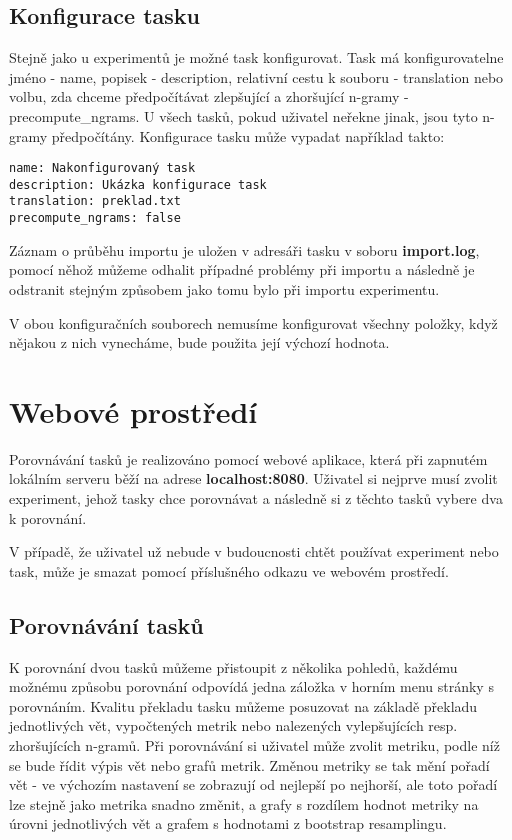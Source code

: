 \subsection{Konfigurace tasku}
Stejně jako u experimentů je možné task konfigurovat.
Task má konfigurovatelne jméno - name, popisek - description,
  relativní cestu k souboru - translation nebo volbu,
  zda chceme předpočítávat zlepšující a zhoršující n-gramy - precompute\_ngrams.
U všech tasků, pokud uživatel neřekne jinak, 
  jsou tyto n-gramy předpočítány.
Konfigurace tasku může vypadat například takto:

\begin{verbatim}
name: Nakonfigurovaný task
description: Ukázka konfigurace task
translation: preklad.txt
precompute_ngrams: false
\end{verbatim}

Záznam o průběhu importu je uložen v adresáři tasku v soboru \textbf{import.log},
  pomocí něhož můžeme odhalit případné problémy při importu
  a následně je odstranit stejným způsobem jako tomu bylo při importu experimentu.

V obou konfiguračních souborech nemusíme konfigurovat všechny položky,
  když nějakou z nich vynecháme,
  bude použita její výchozí hodnota. 

\section{Webové prostředí}
Porovnávání tasků je realizováno pomocí webové aplikace,
  která při zapnutém lokálním serveru běží na adrese \textbf{localhost:8080}.
Uživatel si nejprve musí zvolit experiment,
  jehož tasky chce porovnávat a následně si z těchto tasků vybere dva k porovnání.

V případě,
  že uživatel už nebude v budoucnosti chtět používat experiment nebo task,
  může je smazat pomocí příslušného odkazu ve webovém prostředí.

\subsection{Porovnávání tasků}
K porovnání dvou tasků můžeme přistoupit z několika pohledů,
  každému možnému způsobu porovnání odpovídá jedna záložka v horním menu stránky s porovnáním.
Kvalitu překladu tasku můžeme posuzovat na základě překladu jednotlivých vět,
  vypočtených metrik nebo nalezených vylepšujících resp. zhoršujících n-gramů.
Při porovnávání si uživatel může zvolit metriku,
  podle níž se bude řídit výpis vět nebo grafů metrik.
Změnou metriky se tak mění pořadí vět -
  ve výchozím nastavení se zobrazují od nejlepší po nejhorší,
  ale toto pořadí lze stejně jako metrika snadno změnit,
  a grafy s rozdílem hodnot metriky na úrovni jednotlivých vět
  a grafem s hodnotami z bootstrap resamplingu.


